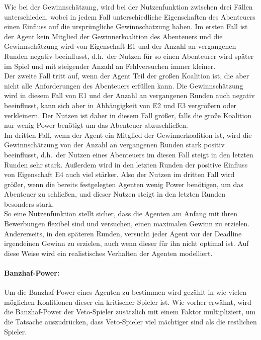 \documentclass[fleqn,10pt]{SelfArx} %
\begin{document}
Wie bei der Gewinnschätzung, wird bei der Nutzenfunktion zwischen drei Fällen unterschieden, wobei in jedem Fall unterschiedliche Eigenschaften des Abenteuers einen Einfluss auf die ursprüngliche Gewinnschätzung haben. Im ersten Fall ist der Agent kein Mitglied der Gewinnerkoalition des Abenteuers und die Gewinnschätzung wird von Eigenschaft E1 und der Anzahl an vergangenen Runden negativ beeinflusst, d.h.\ der Nutzen für so einen Abenteurer wird später im Spiel und mit steigender Anzahl an Fehlversuchen immer kleiner. \\
Der zweite Fall tritt auf, wenn der Agent Teil der großen Koalition ist, die aber nicht alle Anforderungen des Abenteuers erfüllen kann. Die Gewinnschätzung wird in diesem Fall von E1 und der Anzahl an vergangenen Runden auch negativ beeinflusst, kann sich aber in Abhängigkeit von E2 und E3 vergrößern oder verkleinern. Der Nutzen ist daher in diesem Fall größer, falls die große Koalition nur wenig Power benötigt um das Abenteuer abzuschließen. \\
Im dritten Fall, wenn der Agent ein Mitglied der Gewinnerkoalition ist, wird die Gewinnschätzung von der Anzahl an vergangenen Runden stark positiv beeinflusst, d.h.\ der Nutzen eines Abenteuers im diesen Fall steigt in den letzten Runden sehr stark. Außerdem wird in den letzten Runden der positive Einfluss von Eigenschaft E4 auch viel stärker. Also der Nutzen im dritten Fall wird größer, wenn die bereits festgelegten Agenten wenig Power benötigen, um das Abenteuer zu schließen, und dieser Nutzen steigt in den letzten Runden besonders stark.\\
So eine Nutzenfunktion stellt sicher, dass die Agenten am Anfang mit ihren Bewerbungen flexibel sind und versuchen, einen maximalen Gewinn zu erzielen. Andererseits, in den späteren Runden, versucht jeder Agent vor der Deadline irgendeinen Gewinn zu erzielen, auch wenn dieser für ihn nicht optimal ist. Auf diese Weise wird ein realistisches Verhalten der Agenten modelliert. 


\paragraph{Banzhaf-Power:}
Um die Banzhaf-Power eines Agenten zu bestimmen wird gezählt in wie vielen möglichen Koalitionen dieser ein kritischer Spieler ist. Wie vorher erwähnt, wird die Banzhaf-Power der Veto-Spieler zusätzlich mit einem Faktor multipliziert, um die Tatsache auszudrücken, dass Veto-Spieler viel mächtiger sind als die restlichen Spieler.
\end{document}
